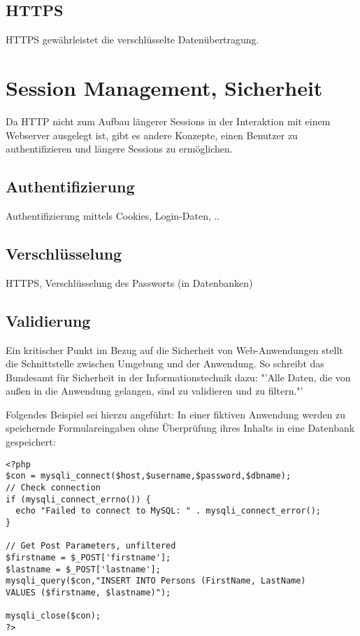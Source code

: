 \documentclass[12pt]{report}
\begin{document}
\subsection{HTTPS}
HTTPS gewährleistet die verschlüsselte Datenübertragung.

\section{Session Management, Sicherheit}
Da HTTP nicht zum Aufbau längerer Sessions in der Interaktion mit einem Webserver ausgelegt ist, gibt es andere Konzepte, einen Benutzer zu authentifizieren und längere Sessions zu ermöglichen.
\subsection{Authentifizierung}
Authentifizierung mittels Cookies, Login-Daten, ..
\subsection{Verschlüsselung}
HTTPS, Verschlüsselung des Passworts (in Datenbanken)
\subsection{Validierung}
Ein kritischer Punkt im Bezug auf die Sicherheit von Web-Anwendungen stellt die Schnittstelle zwischen Umgebung und der Anwendung. \cite[S.212]{ebooks:Architekturen} So schreibt das Bundesamt für Sicherheit in der Informationstechnik dazu: "'Alle Daten, die von außen in die Anwendung gelangen, sind zu validieren und zu filtern."'
\cite[S.20]{BSI}

Folgendes Beispiel sei hierzu angeführt: 
In einer fiktiven Anwendung werden zu speichernde Formulareingaben ohne Überprüfung ihres Inhalts in eine Datenbank gespeichert:

\begin{lstlisting}
<?php
$con = mysqli_connect($host,$username,$password,$dbname);
// Check connection
if (mysqli_connect_errno()) {
  echo "Failed to connect to MySQL: " . mysqli_connect_error();
}

// Get Post Parameters, unfiltered
$firstname = $_POST['firstname'];
$lastname = $_POST['lastname'];
mysqli_query($con,"INSERT INTO Persons (FirstName, LastName)
VALUES ($firstname, $lastname)");

mysqli_close($con);
?>
\end{lstlisting}
\end{document}
